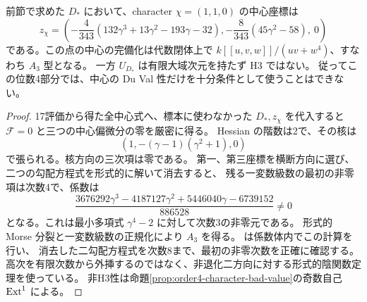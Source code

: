 \begin{proposition}
\label{prop:order4-bad-A3-center}
前節で求めた $D_*$ において、character $\chi=(1,1,0)$ の中心座標は
\[
 z_\chi=\left(-\frac4{343}(132\gamma^3+13\gamma^2-193\gamma-32),
             -\frac8{343}(45\gamma^2-58),\ 0\right)
\]
である。この点の中心の完備化は代数閉体上で
$k[[u,v,w]]/(uv+w^4)$、すなわち $A_3$ 型となる。
一方 $U_{D_*}$ は有限大域次元を持たず H3 ではない。
従ってこの位数4部分では、中心の Du Val 性だけを十分条件として使うことはできない。
\end{proposition}
\begin{proof}
17評価から得た全中心式へ、標本に使わなかった $D_*,z_\chi$ を代入すると
$\mathcal F=0$ と三つの中心偏微分の零を厳密に得る。
Hessian の階数は2で、その核は
\[
 (1,-(\gamma-1)(\gamma^2+1),0)
\]
で張られる。核方向の三次項は零である。
第一、第三座標を横断方向に選び、二つの勾配方程式を形式的に解いて消去すると、
残る一変数級数の最初の非零項は次数4で、係数は
\[
 \frac{3676292\gamma^3-4187127\gamma^2+5446040\gamma-6739152}{886528}\ne0
\]
となる。これは最小多項式 $\gamma^4-2$ に対して次数3の非零元である。
形式的 Morse 分裂と一変数級数の正規化により $A_3$ を得る。
 は係数体内でこの計算を行い、
消去した二勾配方程式を次数8まで、最初の非零次数を正確に確認する。
高次を有限次数から外挿するのではなく、非退化二方向に対する形式的陰関数定理を使っている。
非H3性は命題\ref{prop:order4-character-bad-value}の奇数自己 $\operatorname{Ext}^1$ による。
\end{proof}

